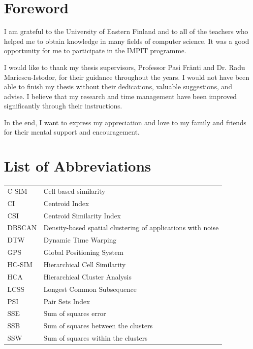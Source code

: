 \newpage


\section*{Foreword}
I am grateful to the University of Eastern Finland and to all of the teachers who helped me to obtain knowledge in many fields of computer science. It was a good opportunity for me to participate in the IMPIT programme. 

I would like to thank my thesis supervisors, Professor Pasi Fr{\"a}nti and Dr. Radu Mariescu-Istodor, for their guidance throughout the years. I would not have been able to finish my thesis without their dedications, valuable suggestions, and advise. I believe that my research and time management have been improved significantly through their instructions.

In the end, I want to express my appreciation and love to my family and friends for their mental support and encouragement.

\newpage


\section*{List of Abbreviations}

\begin{tabular}{lp{12.5cm}}

C-SIM & Cell-based similarity \\

CI & Centroid Index \\

CSI & Centroid Similarity Index \\

DBSCAN & Density-based spatial clustering of applications with noise \\

DTW & Dynamic Time Warping \\

GPS & Global Positioning System \\

HC-SIM & Hierarchical Cell Similarity \\

HCA & Hierarchical Cluster Analysis \\

LCSS & Longest Common Subsequence \\

PSI & Pair Sets Index \\

SSE & Sum of squares error \\

SSB & Sum of squares between the clusters \\

SSW & Sum of squares within the clusters

\end{tabular}

